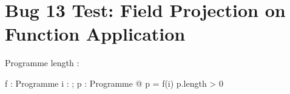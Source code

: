 \documentclass[a4paper,10pt,fleqn]{article}
\begin{document}
\section*{Bug 13 Test: Field Projection on Function Application}

\begin{schema}{Programme}
length : \nat
\end{schema}

\begin{axdef}
f : \nat \fun Programme
\where
\forall i : \nat; p : Programme @ p = f(i) \implies p.length > 0
\end{axdef}
\end{document}
